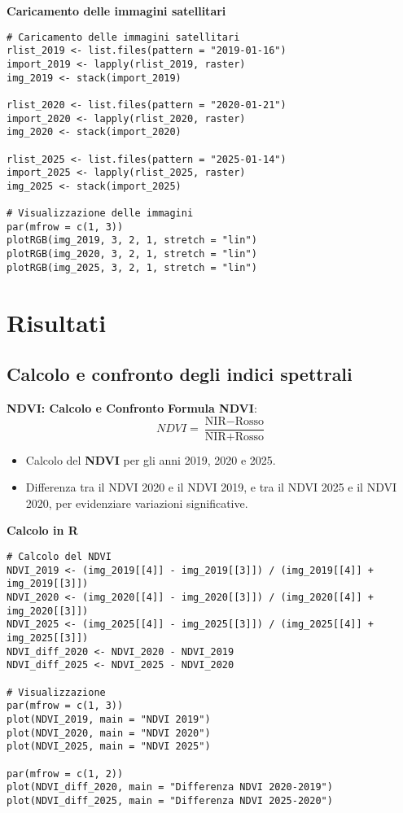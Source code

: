 \documentclass{beamer}
\begin{document}
\begin{frame}[fragile]{\textbf{Caricamento delle immagini satellitari}}
\begin{lstlisting}
# Caricamento delle immagini satellitari
rlist_2019 <- list.files(pattern = "2019-01-16")
import_2019 <- lapply(rlist_2019, raster)
img_2019 <- stack(import_2019)

rlist_2020 <- list.files(pattern = "2020-01-21")
import_2020 <- lapply(rlist_2020, raster)
img_2020 <- stack(import_2020)

rlist_2025 <- list.files(pattern = "2025-01-14")
import_2025 <- lapply(rlist_2025, raster)
img_2025 <- stack(import_2025)

# Visualizzazione delle immagini
par(mfrow = c(1, 3))
plotRGB(img_2019, 3, 2, 1, stretch = "lin")
plotRGB(img_2020, 3, 2, 1, stretch = "lin")
plotRGB(img_2025, 3, 2, 1, stretch = "lin")
\end{lstlisting}
\end{frame}

\section{Risultati}

\subsection{Calcolo e confronto degli indici spettrali}

\begin{frame}{\textbf{NDVI: Calcolo e Confronto}}
\textbf{Formula NDVI}:
\[
NDVI = \frac{\text{NIR} - \text{Rosso}}{\text{NIR} + \text{Rosso}}
\]
\begin{itemize}
    \item Calcolo del \textbf{NDVI} per gli anni 2019, 2020 e 2025.
    \item Differenza tra il NDVI 2020 e il NDVI 2019, e tra il NDVI 2025 e il NDVI 2020, per evidenziare variazioni significative.
\end{itemize}
\end{frame}

\begin{frame}[fragile]{\textbf{Calcolo in R}}
\begin{lstlisting}
# Calcolo del NDVI
NDVI_2019 <- (img_2019[[4]] - img_2019[[3]]) / (img_2019[[4]] + img_2019[[3]])
NDVI_2020 <- (img_2020[[4]] - img_2020[[3]]) / (img_2020[[4]] + img_2020[[3]])
NDVI_2025 <- (img_2025[[4]] - img_2025[[3]]) / (img_2025[[4]] + img_2025[[3]])
NDVI_diff_2020 <- NDVI_2020 - NDVI_2019
NDVI_diff_2025 <- NDVI_2025 - NDVI_2020

# Visualizzazione
par(mfrow = c(1, 3))
plot(NDVI_2019, main = "NDVI 2019")
plot(NDVI_2020, main = "NDVI 2020")
plot(NDVI_2025, main = "NDVI 2025")

par(mfrow = c(1, 2))
plot(NDVI_diff_2020, main = "Differenza NDVI 2020-2019")
plot(NDVI_diff_2025, main = "Differenza NDVI 2025-2020")
\end{lstlisting}
\end{frame}
\end{document}
